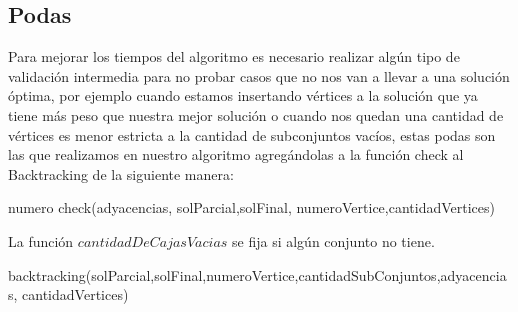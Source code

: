 \subsection{Podas}

Para mejorar los tiempos del algoritmo es necesario realizar algún tipo de validación intermedia para no probar casos que no nos van a llevar a una solución óptima, por ejemplo cuando estamos insertando vértices a la solución que ya tiene más peso que nuestra mejor solución o cuando nos quedan una cantidad de vértices es menor estricta a la cantidad de subconjuntos vacíos, estas podas son las que realizamos en nuestro algoritmo agregándolas a la función check al Backtracking de la siguiente manera:

\begin{algorithm}
  \begin{algorithmic}[1]\parskip=1mm
 \caption{numero check(adyacencias, solParcial,solFinal, numeroVertice,cantidadVertices)}
  \end{algorithmic}
  \end{algorithm}

La función $cantidadDeCajasVacias$ se fija si algún conjunto no tiene.
 
 \begin{algorithm}
 \begin{algorithmic}[1]\parskip=1mm
 \caption{backtracking(solParcial,solFinal,numeroVertice,cantidadSubConjuntos,adyacencias, cantidadVertices)}
  \end{algorithmic}
  \end{algorithm}

